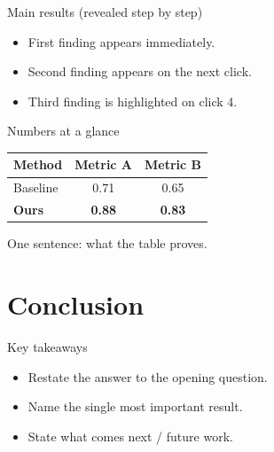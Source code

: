 \documentclass[aspectratio=169]{beamer}  %
\begin{document}
\begin{frame}{Main results (revealed step by step)}
  \begin{itemize}
    \item First finding appears immediately.
    \pause
    \item Second finding appears on the next click.
    \pause
    \item \alert<4>{Third finding is highlighted on click 4.}
  \end{itemize}

  \vspace{0.5em}

\end{frame}

\begin{frame}{Numbers at a glance}
  \begin{center}
    \begin{tabular}{lcc}
      \toprule
      Method        & Metric A & Metric B \\
      \midrule
      Baseline      & 0.71     & 0.65 \\
      \textbf{Ours} & \textbf{0.88} & \textbf{0.83} \\
      \bottomrule
    \end{tabular}
  \end{center}
  \begin{center}\small One sentence: what the table proves.\end{center}
\end{frame}

\section{Conclusion}
\begin{frame}{Key takeaways}
  \begin{itemize}
    \item Restate the answer to the opening question.
    \item Name the single most important result.
    \item State what comes next / future work.
  \end{itemize}
\end{frame}
\end{document}
